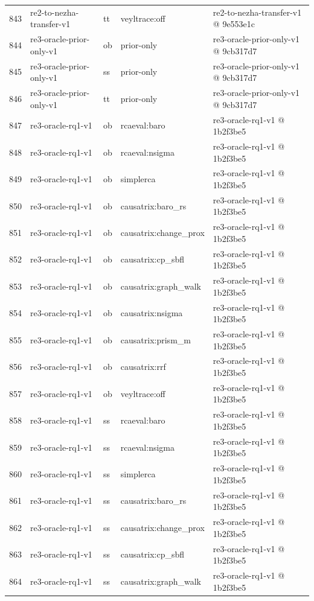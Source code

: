 \begin{longtable}{@{}r>{\raggedright\arraybackslash}p{87.0pt}>{\raggedright\arraybackslash}p{18.0pt}>{\raggedright\arraybackslash}p{63.0pt}>{\raggedright\arraybackslash}p{108.0pt}@{}}
843 & re2-to-nezha-transfer-v1 & tt & veyltrace:off & re2-to-nezha-transfer-v1 @ 9e553e1c \\
844 & re3-oracle-prior-only-v1 & ob & prior-only & re3-oracle-prior-only-v1 @ 9cb317d7 \\
845 & re3-oracle-prior-only-v1 & ss & prior-only & re3-oracle-prior-only-v1 @ 9cb317d7 \\
846 & re3-oracle-prior-only-v1 & tt & prior-only & re3-oracle-prior-only-v1 @ 9cb317d7 \\
847 & re3-oracle-rq1-v1 & ob & rcaeval:baro & re3-oracle-rq1-v1 @ 1b2f3be5 \\
848 & re3-oracle-rq1-v1 & ob & rcaeval:nsigma & re3-oracle-rq1-v1 @ 1b2f3be5 \\
849 & re3-oracle-rq1-v1 & ob & simplerca & re3-oracle-rq1-v1 @ 1b2f3be5 \\
850 & re3-oracle-rq1-v1 & ob & causatrix:baro\_rs & re3-oracle-rq1-v1 @ 1b2f3be5 \\
851 & re3-oracle-rq1-v1 & ob & causatrix:change\_prox & re3-oracle-rq1-v1 @ 1b2f3be5 \\
852 & re3-oracle-rq1-v1 & ob & causatrix:cp\_sbfl & re3-oracle-rq1-v1 @ 1b2f3be5 \\
853 & re3-oracle-rq1-v1 & ob & causatrix:graph\_walk & re3-oracle-rq1-v1 @ 1b2f3be5 \\
854 & re3-oracle-rq1-v1 & ob & causatrix:nsigma & re3-oracle-rq1-v1 @ 1b2f3be5 \\
855 & re3-oracle-rq1-v1 & ob & causatrix:prism\_m & re3-oracle-rq1-v1 @ 1b2f3be5 \\
856 & re3-oracle-rq1-v1 & ob & causatrix:rrf & re3-oracle-rq1-v1 @ 1b2f3be5 \\
857 & re3-oracle-rq1-v1 & ob & veyltrace:off & re3-oracle-rq1-v1 @ 1b2f3be5 \\
858 & re3-oracle-rq1-v1 & ss & rcaeval:baro & re3-oracle-rq1-v1 @ 1b2f3be5 \\
859 & re3-oracle-rq1-v1 & ss & rcaeval:nsigma & re3-oracle-rq1-v1 @ 1b2f3be5 \\
860 & re3-oracle-rq1-v1 & ss & simplerca & re3-oracle-rq1-v1 @ 1b2f3be5 \\
861 & re3-oracle-rq1-v1 & ss & causatrix:baro\_rs & re3-oracle-rq1-v1 @ 1b2f3be5 \\
862 & re3-oracle-rq1-v1 & ss & causatrix:change\_prox & re3-oracle-rq1-v1 @ 1b2f3be5 \\
863 & re3-oracle-rq1-v1 & ss & causatrix:cp\_sbfl & re3-oracle-rq1-v1 @ 1b2f3be5 \\
864 & re3-oracle-rq1-v1 & ss & causatrix:graph\_walk & re3-oracle-rq1-v1 @ 1b2f3be5 \\

\end{longtable}
